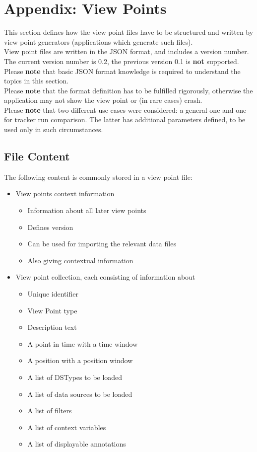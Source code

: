 \section{Appendix: View Points}
\label{sec:appendix_view_points} 

This section defines how the view point files have to be structured and written by view point generators (applications which generate such files). \\

View point files are written in the JSON format, and includes a version number. The current version number is 0.2, the previous version 0.1 is \textbf{not} supported. \\

Please \textbf{note} that basic JSON format knowledge is required to understand the topics in this section. \\

Please \textbf{note} that the format definition has to be fulfilled rigorously, otherwise the application may not show the view point or (in rare cases) crash. \\

Please \textbf{note} that two different use cases were considered: a general one and one for tracker run comparison. The latter has additional parameters defined, to be used only in such circumstances.

\subsection{File Content}

The following content is commonly stored in a view point file:
 \begin{itemize}
 \item View points context information
 \begin{itemize}
 \item Information about all later view points
 \item Defines version
 \item Can be used for importing the relevant data files
 \item Also giving contextual information
 \end{itemize}
 \item View point collection, each consisting of information about
 \begin{itemize}
 \item Unique identifier
 \item View Point type
 \item Description text
 \item A point in time with a time window
 \item A position with a position window
 \item A list of DSTypes to be loaded
 \item A list of data sources to be loaded
 \item A list of filters
 \item A list of context variables
 \item A list of displayable annotations
  \end{itemize}
 \end{itemize}

